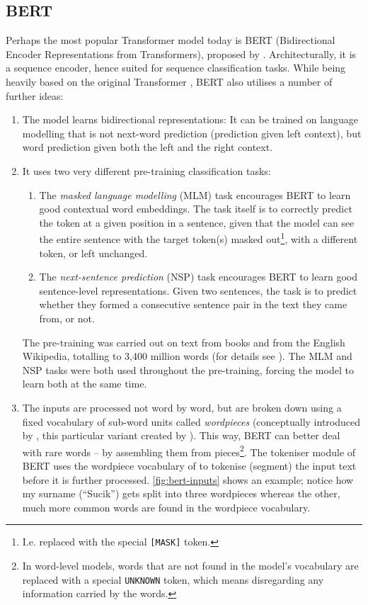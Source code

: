 \documentclass[bsc,frontabs,singlespacing,parskip,deptreport]{infthesis}
\begin{document}
{{    \subsection{BERT}{
      \label{sec:BERT}
      Perhaps the most popular Transformer model today is BERT (Bidirectional Encoder Representations from Transformers), proposed by \citet{Devlin_2018}. Architecturally, it is a sequence encoder, hence suited for sequence classification tasks. While being heavily based on the original Transformer \citep{Vaswani_2017}, BERT also utilises a number of further ideas:
      \begin{enumerate}
        \item The model learns bidirectional representations: It can be trained on language modelling that is not next-word prediction (prediction given left context), but word prediction given both the left and the right context.
        \item {It uses two very different pre-training classification tasks:
        \begin{enumerate}
          \item The \textit{masked language modelling} (MLM) task encourages BERT to learn good contextual word embeddings. The task itself is to correctly predict the token at a given position in a sentence, given that the model can see the entire sentence with the target token(s) masked out\footnote{I.e. replaced with the special \verb|[MASK]| token.}, with a different token, or left unchanged.
          \item The \textit{next-sentence prediction} (NSP) task encourages BERT to learn good sentence-level representations. Given two sentences, the task is to predict whether they formed a consecutive sentence pair in the text they came from, or not.
        \end{enumerate}
        The pre-training was carried out on text from books and from the English Wikipedia, totalling to 3,400 million words (for details see \citet{Devlin_2018}). The MLM and NSP tasks were both used throughout the pre-training, forcing the model to learn both at the same time.
        }
        \item The inputs are processed not word by word, but are broken down using a fixed vocabulary of sub-word units called \textit{wordpieces} (conceptually introduced by \citet{Sennrich_2016}, this particular variant created by \citet{Wu_2016}). This way, BERT can better deal with rare words -- by assembling them from pieces\footnote{In word-level models, words that are not found in the model's vocabulary are replaced with a special \verb|UNKNOWN| token, which means disregarding any information carried by the words.}. The tokeniser module of BERT uses the wordpiece vocabulary of \citeauthor{Wu_2016} to tokenise (segment) the input text before it is further processed. \autoref{fig:bert-inputs} shows an example; notice how my surname (``Sucik'') gets split into three wordpieces whereas the other, much more common words are found in the wordpiece vocabulary.

\end{enumerate}}}}
\end{document}
